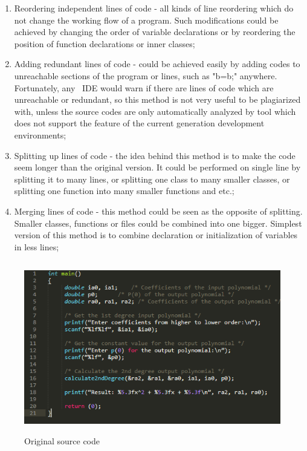 \documentclass[12pt]{article}
\begin{document}
\begin{enumerate}

	\item Reordering independent lines of code - all kinds of line reordering which do not change the working flow of a program. Such modifications could be achieved by changing the order of variable declarations or by reordering the position of function declarations or inner classes;
	
	\item Adding redundant lines of code - could be achieved easily by adding codes to unreachable sections of the program or lines, such as "b=b;" anywhere. Fortunately, any ~\ac{IDE} would warn if there are lines of code which are unreachable or redundant, so this method is not very useful to be plagiarized with, unless the source codes are only automatically analyzed by tool which does not support the feature of the current generation development environments;
	
	\item Splitting up lines of code - the idea behind this method is to make the code seem longer than the original version. It could be performed on single line by splitting it to many lines, or splitting one class to many smaller classes, or splitting one function into many smaller functions and etc.;
	
	\item Merging lines of code - this method could be seen as the opposite of splitting. Smaller classes, functions or files could be combined into one bigger. Simplest version of this method is to combine declaration or initialization of variables in less lines;
	
\end{enumerate}

\begin{figure} [ht]
    \centering
    \includegraphics[width=12cm, height=7.5cm]{../images/sourceCodeStructural1.png}
    \caption{Original source code}
    \label{fig:sourceCodeStructural1}
\end{figure}
\end{document}
